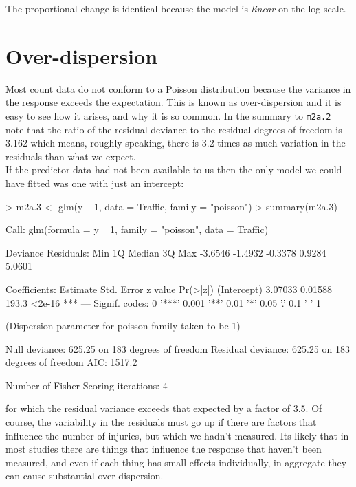 \documentclass{article}
\begin{document}
The proportional change is identical because the model is \emph{linear} on the log scale.

\section{Over-dispersion}  

Most count data do not conform to a Poisson distribution because the variance in the response exceeds the expectation. This is known as over-dispersion and it is easy to see how it arises, and why it is so common. In the summary to \texttt{m2a.2} note that the ratio of the residual deviance  
to the residual degrees of freedom is 3.162 which means, roughly speaking, there is 3.2 times as much variation in the residuals than what we expect.\\

If the predictor data had not been available to us then the only model we could have fitted was one with just an intercept: 

\begin{Schunk}
\begin{Sinput}
> m2a.3 <- glm(y ~ 1, data = Traffic, family = "poisson")
> summary(m2a.3)
\end{Sinput}
\begin{Soutput}
Call:
glm(formula = y ~ 1, family = "poisson", data = Traffic)

Deviance Residuals: 
    Min       1Q   Median       3Q      Max  
-3.6546  -1.4932  -0.3378   0.9284   5.0601  

Coefficients:
            Estimate Std. Error z value Pr(>|z|)    
(Intercept)  3.07033    0.01588   193.3   <2e-16 ***
---
Signif. codes:  0 '***' 0.001 '**' 0.01 '*' 0.05 '.' 0.1 ' ' 1 

(Dispersion parameter for poisson family taken to be 1)

    Null deviance: 625.25  on 183  degrees of freedom
Residual deviance: 625.25  on 183  degrees of freedom
AIC: 1517.2

Number of Fisher Scoring iterations: 4
\end{Soutput}
\end{Schunk}

for which the residual variance exceeds that expected by a factor of 3.5. Of course, the variability in the residuals must go up if there are factors that influence the number of injuries, but which we hadn't measured. Its likely that in most studies there are things that influence the response that haven't been measured, and even if each thing has small effects individually, in aggregate they can cause substantial over-dispersion.
\end{document}
